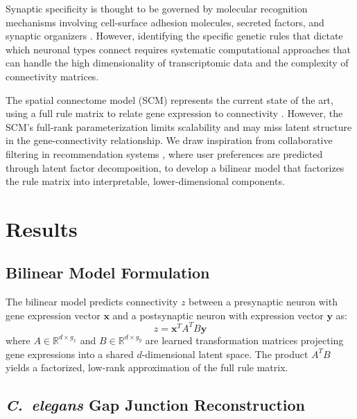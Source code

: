 \documentclass[11pt]{article}
\begin{document}
Synaptic specificity is thought to be governed by molecular recognition mechanisms involving cell-surface adhesion molecules, secreted factors, and synaptic organizers \citep{sanes2020synaptic, sudhof2018towards}. However, identifying the specific genetic rules that dictate which neuronal types connect requires systematic computational approaches that can handle the high dimensionality of transcriptomic data and the complexity of connectivity matrices.

The spatial connectome model (SCM) represents the current state of the art, using a full rule matrix to relate gene expression to connectivity \citep{kovacs2020network}. However, the SCM's full-rank parameterization limits scalability and may miss latent structure in the gene-connectivity relationship. We draw inspiration from collaborative filtering in recommendation systems \citep{koren2009matrix}, where user preferences are predicted through latent factor decomposition, to develop a bilinear model that factorizes the rule matrix into interpretable, lower-dimensional components.

\section{Results}

\subsection{Bilinear Model Formulation}

The bilinear model predicts connectivity $z$ between a presynaptic neuron with gene expression vector $\mathbf{x}$ and a postsynaptic neuron with expression vector $\mathbf{y}$ as:
\begin{equation}
z = \mathbf{x}^T A^T B \mathbf{y}
\end{equation}
where $A \in \mathbb{R}^{d \times g_x}$ and $B \in \mathbb{R}^{d \times g_y}$ are learned transformation matrices projecting gene expressions into a shared $d$-dimensional latent space. The product $A^T B$ yields a factorized, low-rank approximation of the full rule matrix.

\subsection{\textit{C.~elegans} Gap Junction Reconstruction}
\end{document}
